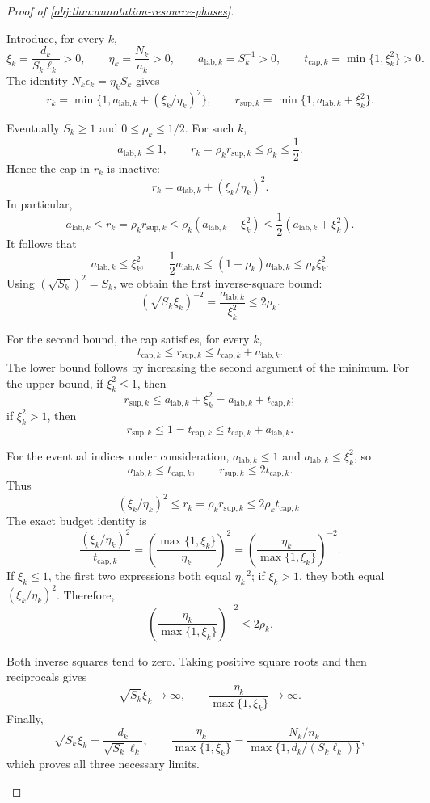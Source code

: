 \begin{proof}[Proof of \cref{obj:thm:annotation-resource-phases}]
\begin{enumerate}
Introduce, for every \(k\),
\[
\xi_k=\frac{d_k}{S_k\ell_k}>0,\qquad
\eta_k=\frac{N_k}{n_k}>0,\qquad
a_{\mathrm{lab},k}=S_k^{-1}>0,\qquad
t_{\mathrm{cap},k}=\min\{1,\xi_k^2\}>0.
\]
The identity \(N_k\epsilon_k=\eta_kS_k\) gives
\[
r_k=\min\{1,a_{\mathrm{lab},k}+(\xi_k/\eta_k)^2\},
\qquad
r_{\mathrm{sup},k}=\min\{1,a_{\mathrm{lab},k}+\xi_k^2\}.
\]

Eventually \(S_k\ge1\) and \(0\le\rho_k\le1/2\). For such \(k\),
\[
a_{\mathrm{lab},k}\le1,\qquad
r_k=\rho_kr_{\mathrm{sup},k}\le\rho_k\le\frac12.
\]
Hence the cap in \(r_k\) is inactive:
\[
r_k=a_{\mathrm{lab},k}+(\xi_k/\eta_k)^2.
\]
In particular,
\[
a_{\mathrm{lab},k}
\le r_k
=\rho_kr_{\mathrm{sup},k}
\le\rho_k(a_{\mathrm{lab},k}+\xi_k^2)
\le\frac12(a_{\mathrm{lab},k}+\xi_k^2).
\]
It follows that
\[
a_{\mathrm{lab},k}\le\xi_k^2,
\qquad
\frac12a_{\mathrm{lab},k}
\le(1-\rho_k)a_{\mathrm{lab},k}
\le\rho_k\xi_k^2.
\]
Using \((\sqrt{S_k})^2=S_k\), we obtain the first inverse-square bound:
\[
(\sqrt{S_k}\xi_k)^{-2}
=\frac{a_{\mathrm{lab},k}}{\xi_k^2}
\le2\rho_k.
\]

For the second bound, the cap satisfies, for every \(k\),
\[
t_{\mathrm{cap},k}\le r_{\mathrm{sup},k}
\le t_{\mathrm{cap},k}+a_{\mathrm{lab},k}.
\]
The lower bound follows by increasing the second argument of the minimum. For the upper bound, if \(\xi_k^2\le1\), then
\[
r_{\mathrm{sup},k}\le a_{\mathrm{lab},k}+\xi_k^2
=a_{\mathrm{lab},k}+t_{\mathrm{cap},k};
\]
if \(\xi_k^2>1\), then
\[
r_{\mathrm{sup},k}\le1=t_{\mathrm{cap},k}
\le t_{\mathrm{cap},k}+a_{\mathrm{lab},k}.
\]

For the eventual indices under consideration,
\(a_{\mathrm{lab},k}\le1\) and
\(a_{\mathrm{lab},k}\le\xi_k^2\), so
\[
a_{\mathrm{lab},k}\le t_{\mathrm{cap},k},
\qquad
r_{\mathrm{sup},k}\le2t_{\mathrm{cap},k}.
\]
Thus
\[
(\xi_k/\eta_k)^2
\le r_k
=\rho_kr_{\mathrm{sup},k}
\le2\rho_kt_{\mathrm{cap},k}.
\]
The exact budget identity is
\[
\frac{(\xi_k/\eta_k)^2}{t_{\mathrm{cap},k}}
=
\left(\frac{\max\{1,\xi_k\}}{\eta_k}\right)^2
=
\left(\frac{\eta_k}{\max\{1,\xi_k\}}\right)^{-2}.
\]
If \(\xi_k\le1\), the first two expressions both equal
\(\eta_k^{-2}\); if \(\xi_k>1\), they both equal
\((\xi_k/\eta_k)^2\). Therefore,
\[
\left(\frac{\eta_k}{\max\{1,\xi_k\}}\right)^{-2}
\le2\rho_k.
\]

Both inverse squares tend to zero. Taking positive square roots and then reciprocals gives
\[
\sqrt{S_k}\xi_k\longrightarrow\infty,
\qquad
\frac{\eta_k}{\max\{1,\xi_k\}}\longrightarrow\infty.
\]
Finally,
\[
\sqrt{S_k}\xi_k
=\frac{d_k}{\sqrt{S_k}\ell_k},
\qquad
\frac{\eta_k}{\max\{1,\xi_k\}}
=
\frac{N_k/n_k}{\max\{1,d_k/(S_k\ell_k)\}},
\]
which proves all three necessary limits.


\end{enumerate}
\end{proof}
